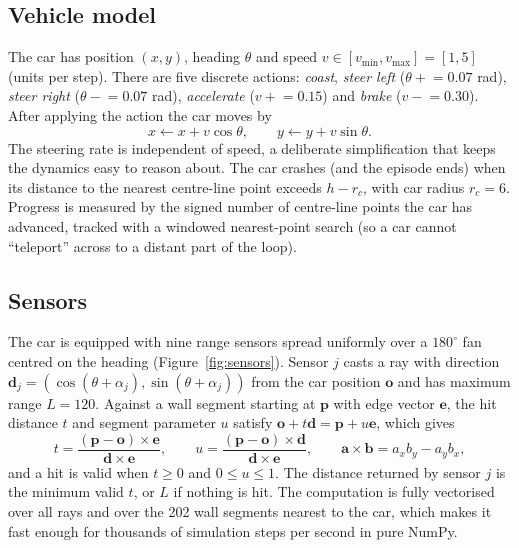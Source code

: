 \documentclass[11pt,a4paper]{article}
\begin{document}
\subsection{Vehicle model}
The car has position \((x,y)\), heading \(\theta\) and speed \(v\in[v_{\min},v_{\max}]=[1,5]\) (units per step).
There are five discrete actions:
\emph{coast}, \emph{steer left} (\(\theta\mathrel{+}=0.07\) rad), \emph{steer right} (\(\theta\mathrel{-}=0.07\) rad), \emph{accelerate} (\(v\mathrel{+}=0.15\)) and \emph{brake} (\(v\mathrel{-}=0.30\)).
After applying the action the car moves by
\begin{equation}
  x\leftarrow x+v\cos\theta,\qquad y\leftarrow y+v\sin\theta .
\end{equation}
The steering rate is independent of speed, a deliberate simplification that keeps the dynamics easy to reason about.
The car crashes (and the episode ends) when its distance to the nearest centre-line point exceeds \(h-r_c\), with car radius \(r_c=6\).
Progress is measured by the signed number of centre-line points the car has advanced, tracked with a windowed nearest-point search (so a car cannot ``teleport'' across to a distant part of the loop).

\subsection{Sensors}
The car is equipped with nine range sensors spread uniformly over a \(180^\circ\) fan centred on the heading (Figure~\ref{fig:sensors}).
Sensor \(j\) casts a ray with direction \(\mathbf d_j=(\cos(\theta+\alpha_j),\sin(\theta+\alpha_j))\) from the car position \(\mathbf o\) and has maximum range \(L=120\).
Against a wall segment starting at \(\mathbf p\) with edge vector \(\mathbf e\), the hit distance \(t\) and segment parameter \(u\) satisfy \(\mathbf o+t\mathbf d=\mathbf p+u\mathbf e\), which gives
\begin{equation}
  t=\frac{(\mathbf p-\mathbf o)\times\mathbf e}{\mathbf d\times\mathbf e},\qquad
  u=\frac{(\mathbf p-\mathbf o)\times\mathbf d}{\mathbf d\times\mathbf e},\qquad
  \mathbf a\times\mathbf b=a_xb_y-a_yb_x ,
\end{equation}
and a hit is valid when \(t\ge0\) and \(0\le u\le1\).
The distance returned by sensor \(j\) is the minimum valid \(t\), or \(L\) if nothing is hit.
The computation is fully vectorised over all rays and over the 202 wall segments nearest to the car, which makes it fast enough for thousands of simulation steps per second in pure NumPy.
\end{document}
